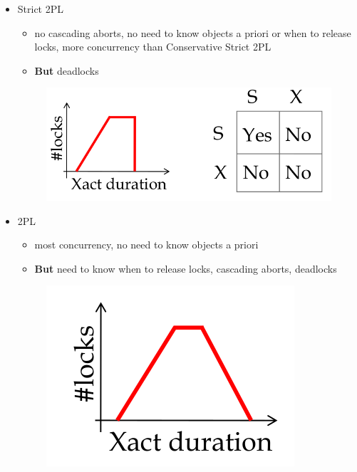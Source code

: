 \begin{itemize}
\item Strict 2PL
  \begin{itemize}
  \item no cascading aborts, no need to know objects a priori or
    when to release locks, more concurrency than
    Conservative Strict 2PL
  \item \textbf{But} deadlocks
  \end{itemize}
\begin{figure}[h]
  \begin{minipage}{1.0\linewidth}
    \begin{center}
      \includegraphics[scale=0.15]{graphics/S2PL.png}
    \end{center}
  \end{minipage}
\end{figure}

\vspace{1.5cm}
\item 2PL
  \begin{itemize}
  \item most concurrency, no need to know objects a priori
  \item \textbf{But} need to know when to release locks,
    cascading aborts, deadlocks
  \end{itemize}
\begin{figure}[h]
  \begin{minipage}{1.0\linewidth}
    \begin{center}
      \includegraphics[scale=0.15]{graphics/2PL.png}
    \end{center}
  \end{minipage}
\end{figure}
\end{itemize}

